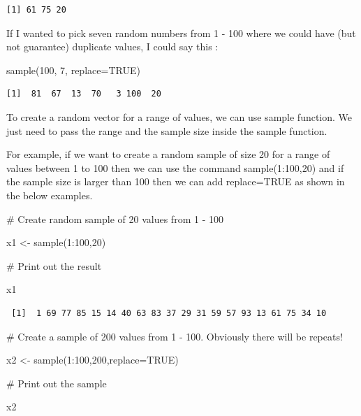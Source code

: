 \documentclass[
  letterpaper,
  DIV=11,
  numbers=noendperiod]{scrreprt}
\newenvironment{Shaded}{\begin{snugshade}}{\end{snugshade}}
\newcommand{\AttributeTok}[1]{\textcolor[rgb]{0.40,0.45,0.13}{#1}}
\newcommand{\CommentTok}[1]{\textcolor[rgb]{0.37,0.37,0.37}{#1}}
\newcommand{\ConstantTok}[1]{\textcolor[rgb]{0.56,0.35,0.01}{#1}}
\newcommand{\DecValTok}[1]{\textcolor[rgb]{0.68,0.00,0.00}{#1}}
\newcommand{\FunctionTok}[1]{\textcolor[rgb]{0.28,0.35,0.67}{#1}}
\newcommand{\NormalTok}[1]{\textcolor[rgb]{0.00,0.23,0.31}{#1}}
\newcommand{\OtherTok}[1]{\textcolor[rgb]{0.00,0.23,0.31}{#1}}
\newcommand{\SpecialCharTok}[1]{\textcolor[rgb]{0.37,0.37,0.37}{#1}}
\begin{document}
\begin{verbatim}
[1] 61 75 20
\end{verbatim}

If I wanted to pick seven random numbers from 1 - 100 where we could
have (but not guarantee) duplicate values, I could say this :

\begin{Shaded}
\begin{Highlighting}[]
\FunctionTok{sample}\NormalTok{(}\DecValTok{100}\NormalTok{, }\DecValTok{7}\NormalTok{, }\AttributeTok{replace=}\ConstantTok{TRUE}\NormalTok{)}
\end{Highlighting}
\end{Shaded}

\begin{verbatim}
[1]  81  67  13  70   3 100  20
\end{verbatim}

To create a random vector for a range of values, we can use sample
function. We just need to pass the range and the sample size inside the
sample function.

For example, if we want to create a random sample of size 20 for a range
of values between 1 to 100 then we can use the command sample(1:100,20)
and if the sample size is larger than 100 then we can add replace=TRUE
as shown in the below examples.

\begin{Shaded}
\begin{Highlighting}[]
\CommentTok{\# Create random sample of 20 values from 1 {-} 100}

\NormalTok{x1 }\OtherTok{\textless{}{-}} \FunctionTok{sample}\NormalTok{(}\DecValTok{1}\SpecialCharTok{:}\DecValTok{100}\NormalTok{,}\DecValTok{20}\NormalTok{)}

\CommentTok{\# Print out the result}

\NormalTok{x1}
\end{Highlighting}
\end{Shaded}

\begin{verbatim}
 [1]  1 69 77 85 15 14 40 63 83 37 29 31 59 57 93 13 61 75 34 10
\end{verbatim}

\begin{Shaded}
\begin{Highlighting}[]
\CommentTok{\# Create a sample of 200 values from 1 {-} 100. Obviously there will be repeats!}

\NormalTok{x2 }\OtherTok{\textless{}{-}} \FunctionTok{sample}\NormalTok{(}\DecValTok{1}\SpecialCharTok{:}\DecValTok{100}\NormalTok{,}\DecValTok{200}\NormalTok{,}\AttributeTok{replace=}\ConstantTok{TRUE}\NormalTok{)}

\CommentTok{\# Print out the sample}

\NormalTok{x2}
\end{Highlighting}
\end{Shaded}
\end{document}
